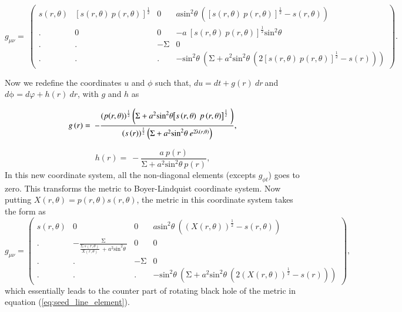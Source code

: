\documentclass[12pt,a4paper,oneside]{book}
\newcommand{\eq}[2]{\begin{equation} \label{eq:#1} #2 \end{equation}}
\newcommand{\Eref}[1]{(\ref{eq:#1})}
\begin{document}
\eq{m1}{g_{\mu \nu }=\ \left( \begin{array}{cccc}
s\left(r,\theta \right) & {\left[s\left(r,\theta \right)\ p\left(r,\theta \right)\right]}^{\frac{1}{2}} & 0 & a{{\mathrm{sin}}^{\mathrm{2}} \theta \ }\left({\left[s\left(r,\theta \right)\ p\left(r,\theta \right)\right]}^{\frac{1}{2}}-s\left(r,\theta \right)\right) \\ 
. & 0 & 0 & -a\ {\left[s\left(r,\theta \right)\ p\left(r,\theta \right)\right]}^{\frac{1}{2}}{{\mathrm{sin}}^{\mathrm{2}} \theta \ } \\ 
. & . & -\mathrm{\Sigma } & 0 \\ 
. & . & . & -{{\mathrm{sin}}^{\mathrm{2}} \theta \ }\left(\mathrm{\Sigma }+a^2{{\mathrm{sin}}^{\mathrm{2}} \theta \ }\left(2{\left[s\left(r,\theta \right)\ p\left(r,\theta \right)\right]}^{\frac{1}{2}}-s\left(r\right)\right)\right) \end{array}
\right).}


\noindent Now we redefine the coordinates $u$  and $\phi$ such that, $du=dt+g\left(r\right)\ dr\ $and $d\mathrm{\phi }=d\varphi +h(r)\ dr$, with $g$ and $h$ as

\eq{}{g\left(r\right)=\ -\frac{(p{\left(r,\theta \right))}^{\frac{1}{2}}\left(\mathrm{\Sigma }+a^2{{\mathrm{sin}}^{\mathrm{2}} \theta {\left[s\left(r,\theta \right)\ p\left(r,\theta \right)\right]}^{\frac{1}{2}}\ }\right)}{{\left(s\left(r\right)\right)}^{\frac{1}{2}}\left(\mathrm{\Sigma }+a^2{{\mathrm{sin}}^{\mathrm{2}} \theta \ }e^{2\mathrm{\lambdaup }\left(r,\theta \right)}\right)},}

\eq{}{h\left(r\right)=\ -\frac{a\ p\left(r\right)}{\mathrm{\Sigma }+a^2{{\mathrm{sin}}^{\mathrm{2}} \theta \ }p\left(r\right)},}
In this new coordinate system, all the non-diagonal elements (excepts $g_{\phi t}$) goes to zero. This transforms the metric to Boyer-Lindquist coordinate system. Now putting $X(r,\theta) = p(r,\theta)s(r,\theta)$, the metric in this coordinate system takes the form as
\eq{6}{g_{\mu \nu }=\left( \begin{array}{cccc}
s\left(r,\theta \right) & 0 & 0 & a{{\mathrm{sin}}^{\mathrm{2}} \theta \ }\left({\left(X\left(r,\theta \right)\right)}^{\frac{1}{2}}-s\left(r,\theta \right)\right) \\ 
. & -\frac{\mathrm{\Sigma }}{\frac{\mathrm{\Sigma }\mathrm{\ }s\left(r,\theta \right)}{X\left(r,\theta \right)}\ +a^2{{\mathrm{sin}}^{\mathrm{2}} \theta \ }} & 0 & 0 \\ 
. & . & \mathrm{-}\mathrm{\Sigma } & 0 \\ 
. & . & . & -{{\mathrm{sin}}^{\mathrm{2}} \theta \ }\left(\mathrm{\Sigma }+a^2{{\mathrm{sin}}^{\mathrm{2}} \theta \ }\left(2{\left(X\left(r,\theta \right)\right)}^{\frac{1}{2}}-s\left(r\right)\right)\right) \end{array}
\right), }
which essentially leads to the counter part of rotating black hole of the metric in equation \Eref{seed_line_element}.
\end{document}
